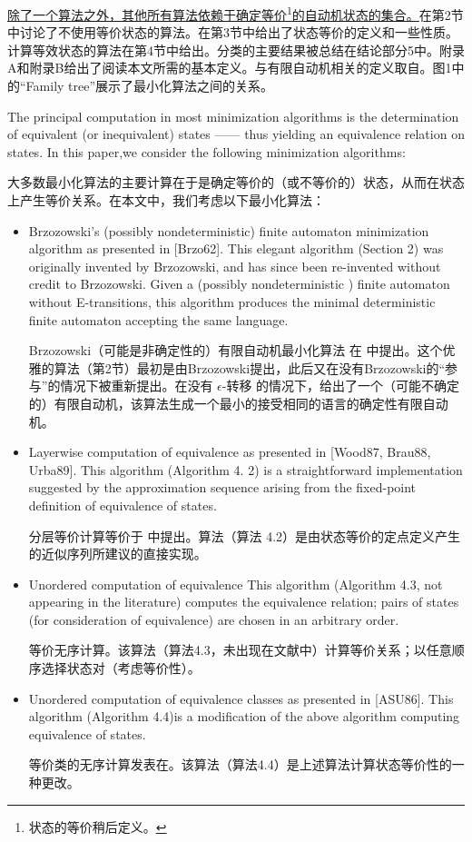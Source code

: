 \uline{除了一个算法之外，其他所有算法依赖于确定等价}\footnote{状态的等价稍后定义。}\uline{的自动机状态的集合。}在第2节中讨论了不使用等价状态的算法。在第3节中给出了状态等价的定义和一些性质。计算等效状态的算法在第4节中给出。分类的主要结果被总结在结论部分5中。附录A和附录B给出了阅读本文所需的基本定义。与有限自动机相关的定义取自\cite{Wats93}。图1中的“Family tree”展示了最小化算法之间的关系。

The principal computation in most minimization algorithms is the determination of equivalent (or inequivalent) states —— thus yielding an equivalence relation on states. In this paper,we consider the following minimization algorithms:

大多数最小化算法的主要计算在于是确定等价的（或不等价的）状态，从而在状态上产生等价关系。在本文中，我们考虑以下最小化算法：

\begin{itemize}
    \item Brzozowski's (possibly nondeterministic) finite automaton minimization algorithm as presented in [Brzo62]. This elegant algorithm (Section 2) was originally invented by Brzozowski, and has since been re-invented without credit to Brzozowski. Given a (possibly nondeterministic ) finite automaton without E-transitions, this algorithm produces the minimal deterministic finite automaton accepting the same language.
    
    Brzozowski（可能是非确定性的）有限自动机最小化算法 在 \cite{Brzo62} 中提出。这个优雅的算法（第2节）最初是由Brzozowski提出，此后又在没有Brzozowski的“参与”的情况下被重新提出。在没有 $\epsilon$-转移 的情况下，给出了一个（可能不确定的）有限自动机，该算法生成一个最小的接受相同的语言的确定性有限自动机。

    \item Layerwise computation of equivalence as presented in [Wood87, \cite{Moor56} Brau88, Urba89]. This algorithm (Algorithm 4. 2) is a straightforward implementation suggested by the approximation sequence arising from the fixed-point definition of equivalence of states. 

    分层等价计算等价于 \cite{Wood87, Moor56, Brau88, Urba89} 中提出。算法（算法 4.2）是由状态等价的定点定义产生的近似序列所建议的直接实现。

    \item Unordered computation of equivalence This algorithm (Algorithm 4.3, not appearing in the literature) computes the equivalence relation; pairs of states (for consideration of equivalence) are chosen in an arbitrary order.

    等价无序计算。该算法（算法4.3，未出现在文献中）计算等价关系；以任意顺序选择状态对（考虑等价性）。

    \item Unordered computation of equivalence classes as presented in [ASU86]. This algorithm (Algorithm 4.4)is a modification of the above algorithm computing equivalence of states.

    等价类的无序计算发表在\cite{ASU86}。该算法（算法4.4）是上述算法计算状态等价性的一种更改。

\end{itemize}

